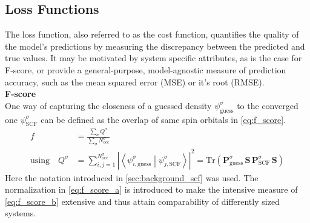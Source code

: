 \subsection{Loss Functions}
\label{subsec:background_loss_function}
The loss function, also referred to as the cost function, quantifies the quality of the model's predictions by measuring the discrepancy between the predicted and true values. It may be motivated by system specific attributes, as is the case for F-score, or provide a general-purpose, model-agnostic measure of prediction accuracy, such as the mean squared error (MSE) or it's root (RMSE). \\

\textbf{F-score}\\
One way of capturing the closeness of a guessed density $\psi^\sigma_{\text{guess}}$ to the converged one $\psi^\sigma_{\text{SCF}}$ can be defined as the overlap of same spin orbitals in \autoref{eq:f_score}.
\begin{subequations}
\label{eq:f_score}
\begin{align}
    f &= \frac{\sum\limits_\sigma Q^\sigma}{\sum\limits_\sigma N^\sigma_\text{occ}} \label{eq:f_score_a}\\
    \text{using} \quad Q^\sigma &= \sum_{i,j=1}^{N^\sigma_\text{occ}} \left| \left\langle \psi^\sigma_{i,\text{guess}} \middle| \psi^\sigma_{j,\text{SCF}} \right\rangle \right|^2 = \mathrm{Tr}\left( \mathbf{P}^{\sigma}_\text{guess} \, \mathbf{S} \, \mathbf{P}^{\sigma}_\text{SCF} \, \mathbf{S} \right)  \label{eq:f_score_b}
\end{align}
\end{subequations}
Here the notation introduced in \autoref{sec:background_scf} was used. The normalization in \autoref{eq:f_score_a} is introduced to make the intensive measure of \autoref{eq:f_score_b} extensive and thus attain comparability of differently sized systems.


